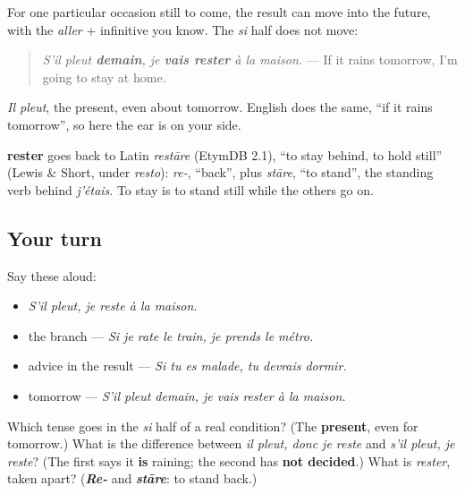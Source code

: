 \begin{grammarlens}[title={Grammar Lens: tomorrow, still in the present}]
For one particular occasion still to come, the result can move into the future, with the \emph{aller} + infinitive you know. The \emph{si} half does not move:

\begin{quote}
\emph{S'il pleut \textbf{demain}, je \textbf{vais rester} à la maison.} — If it rains tomorrow, I'm going to stay at home.
\end{quote}

\emph{Il pleut}, the present, even about tomorrow. English does the same, \textquotedblleft{}if it rains tomorrow\textquotedblright{}, so here the ear is on your side.
\end{grammarlens}

\begin{cousinweb}
\textbf{rester} goes back to Latin \emph{restāre} (EtymDB 2.1), \textquotedblleft{}to stay behind, to hold still\textquotedblright{} (Lewis \& Short, under \emph{resto}): \emph{re-}, \textquotedblleft{}back\textquotedblright{}, plus \emph{stāre}, \textquotedblleft{}to stand\textquotedblright{}, the standing verb behind \emph{j'étais}. To stay is to stand still while the others go on.
\end{cousinweb}

\subsection*{Your turn}
Say these aloud:

\begin{itemize}
\raggedright
  \item \emph{S'il pleut, je reste à la maison.}
  \item the branch — \emph{Si je rate le train, je prends le métro.}
  \item advice in the result — \emph{Si tu es malade, tu devrais dormir.}
  \item tomorrow — \emph{S'il pleut demain, je vais rester à la maison.}
\end{itemize}

\begin{tcolorbox}[breakable,colback=teal!4,colframe=teal!35!black,title={Before you move on}]
Which tense goes in the \emph{si} half of a real condition? (The \textbf{present}, even for tomorrow.) What is the difference between \emph{il pleut, donc je reste} and \emph{s'il pleut, je reste}? (The first says it \textbf{is} raining; the second has \textbf{not decided}.) What is \emph{rester}, taken apart? (\emph{\textbf{Re-}} and \emph{\textbf{stāre}}: to stand back.)
\end{tcolorbox}
